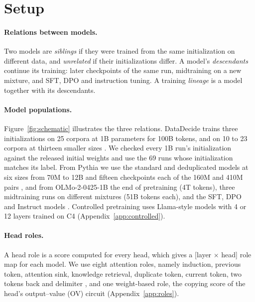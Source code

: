 \documentclass[11pt]{article}
\begin{document}
\section{Setup}
\label{sec:setup}

\paragraph{Relations between models.}
Two models are \emph{siblings} if they were trained from the same initialization on different data, and \emph{unrelated} if their initializations differ.
A model's \emph{descendants} continue its training: later checkpoints of the same run, midtraining on a new mixture, and SFT, DPO and instruction tuning.
A training \emph{lineage} is a model together with its descendants.

\paragraph{Model populations.}
Figure~\ref{fig:schematic} illustrates the three relations.
DataDecide trains three initializations on 25 corpora at 1B parameters for 100B tokens, and on 10 to 23 corpora at thirteen smaller sizes \citep{magnusson2025datadecide}.
We checked every 1B run's initialization against the released initial weights and use the 69 runs whose initialization matches its label.
From Pythia we use the standard and deduplicated models at six sizes from 70M to 12B and fifteen checkpoints each of the 160M and 410M pairs \citep{biderman2023pythia}, and from OLMo-2-0425-1B the end of pretraining (4T tokens), three midtraining runs on different mixtures (51B tokens each), and the SFT, DPO and Instruct models \citep{olmo2024olmo2}.
Controlled pretraining uses Llama-style models with 4 or 12 layers trained on C4 (Appendix~\ref{app:controlled}).

\paragraph{Head roles.}
A head role is a score computed for every head, which gives a [layer $\times$ head] role map for each model.
We use eight attention roles, namely induction, previous token, attention sink, knowledge retrieval, duplicate token, current token, two tokens back and delimiter \citep{olsson2022context,xiao2024efficient,wu2025retrieval}, and one weight-based role, the copying score of the head's output--value (OV) circuit (Appendix~\ref{app:roles}).
\end{document}
